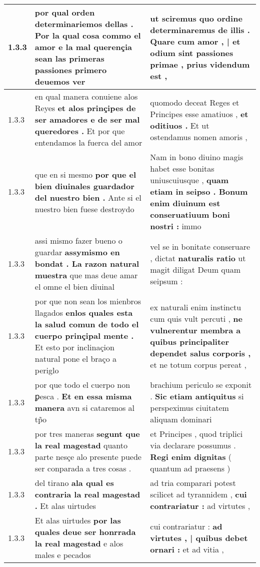 \begin{tabular}{|p{1cm}|p{6.5cm}|p{6.5cm}|}
1.3.3 & por qual orden determinariemos dellas . \textbf{ Por la qual cosa commo el amor e la mal querençia sean las primeras passiones } primero deuemos ver & ut sciremus quo ordine determinaremus de illis . \textbf{ Quare cum amor , | et odium sint passiones primae , } prius videndum est , \\\hline
1.3.3 & en qual manera conuiene alos Reyes \textbf{ et alos prinçipes de ser amadores e de ser mal queredores . } Et por que entendamos la fuerca del amor & quomodo deceat Reges et Principes esse amatiuos , \textbf{ et oditiuos . } Et ut ostendamus nomen amoris , \\\hline
1.3.3 & que en si mesmo \textbf{ por que el bien diuinales guardador del nuestro bien . } Ante si el nuestro bien fuese destroydo & Nam in bono diuino magis habet esse bonitas uniuscuiusque , \textbf{ quam etiam in seipso . Bonum enim diuinum est conseruatiuum boni nostri : } immo \\\hline
1.3.3 & assi mismo fazer bueno o guardar \textbf{ assymismo en bondat . La razon natural muestra } que mas deue amar el omne el bien diuinal & vel se in bonitate conseruare , dictat \textbf{ naturalis ratio } ut magit diligat Deum quam seipsum : \\\hline
1.3.3 & por que non sean los mienbros llagados \textbf{ enlos quales esta la salud comun de todo el cuerpo prinçipal mente . } Et esto por inclinaçion natural pone el braço a periglo & ex naturali enim instinctu cum quis vult percuti , \textbf{ ne vulnerentur membra a quibus principaliter dependet salus corporis , } et ne totum corpus pereat , \\\hline
1.3.3 & por que todo el cuerpo non ꝑesca . \textbf{ Et en essa misma manera } avn si cataremos al tp̃o & brachium periculo se exponit . \textbf{ Sic etiam antiquitus } si perspeximus ciuitatem aliquam dominari \\\hline
1.3.3 & por tres maneras \textbf{ segunt que la real magestad } quanto parte nesçe alo presente puede ser conparada a tres cosas . & et Principes , quod triplici via declarare possumus . \textbf{ Regi enim dignitas } ( quantum ad praesens ) \\\hline
1.3.3 & del tirano \textbf{ ala qual es contraria la real magestad . } Et alas uirtudes & ad tria comparari potest scilicet ad tyrannidem , \textbf{ cui contrariatur : } ad virtutes , \\\hline
1.3.3 & Et alas uirtudes \textbf{ por las quales deue ser honrrada la real magestad } e alos males e pecados & cui contrariatur : \textbf{ ad virtutes , | quibus debet ornari : } et ad vitia , \\\hline

\end{tabular}
